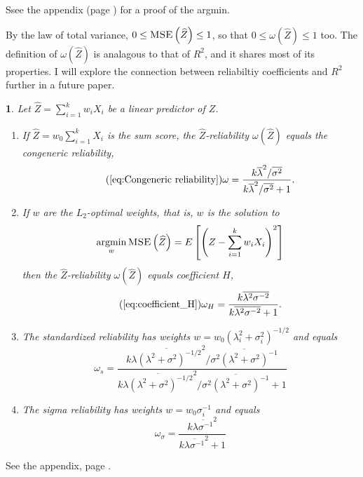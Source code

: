 \documentclass{article}
\makeatletter
\theoremstyle{plain}
\theoremstyle{plain}
\theoremstyle{definition}
\theoremstyle{remark}
\theoremstyle{definition}
\theoremstyle{plain}
\theoremstyle{plain}
\newtheorem{prop}[thm]{\protect\propositionname}
\theoremstyle{definition}
\newenvironment{proof}[1][\protect\proofname]{\par
	\normalfont\topsep6\p@\@plus6\p@\relax
	\trivlist
	\itemindent\parindent
	\item[\hskip\labelsep\scshape #1]\ignorespaces
}{%
	\endtrivlist\@endpefalse
}
\providecommand{\proofname}{Proof}
\providecommand{\propositionname}{Proposition}
\DeclareMathOperator{\argmin}{argmin}
\makeatother
\begin{document}
Ssee the appendix (page \pageref{proof:w0}) for a proof of the argmin.

By the law of total variance, $0\leq\textsc{MSE}\left(\widehat{Z}\right)\leq1$,
so that $0\leq\omega\left(\widehat{Z}\right)\leq1$ too. The definition
of $\omega(\widehat{Z})$ is analagous to that of $R^{2}$, and it
shares most of its properties. I will explore the connection between
reliabiltiy coefficients and $R^{2}$ further in a future paper.
\begin{prop}
\label{prop:Z-reliabiltiy}Let $\widehat{Z}=\sum_{i=1}^{k}w_{i}X_{i}$
be a linear predictor of $Z$.

\begin{enumerate}[label=(\roman*)]
\item If $\widehat{Z}=w_{0}\sum_{i=1}^{k}X_{i}$ is the sum score, the $\widehat{Z}$-reliability
$\omega\left(\widehat{Z}\right)$ equals the congeneric reliability,
\begin{equation}
\tag{\ref{eq:Congeneric reliability}}
\omega=\frac{k\overline{\lambda}^{2}/\overline{\sigma^{2}}}{k\overline{\lambda}^{2}/\overline{\sigma^{2}}+1}.
\end{equation}
\item If $w$ are the $L_{2}$-optimal weights, that is, $w$ is the solution
to
\[
\argmin_{w}\textsc{MSE}\left(\widehat{Z}\right)=E\left[\left(Z-\sum_{i=1}^{k}w_{i}X_{i}\right)^{2}\right]
\]
then the $\widehat{Z}$-reliability $\omega\left(\widehat{Z}\right)$
equals coefficient $H$,
\begin{equation}
\tag{\ref{eq:coefficient_H}}
\omega_{H}=\frac{k\overline{\lambda^{2}\sigma^{-2}}}{k\overline{\lambda^{2}\sigma^{-2}}+1}.
\end{equation}
\item The standardized reliability has weights $w=w_{0}(\lambda_{i}^{2}+\sigma_{i}^{2})^{-1/2}$ and equals
\begin{equation}
\omega_s=\frac{k\overline{\lambda(\lambda^{2}+\sigma^{2})^{-1/2}}^{2}/\overline{\sigma^{2}(\lambda^{2}+\sigma^{2})^{-1}}}{k\overline{\lambda(\lambda^{2}+\sigma^{2})^{-1/2}}^{2}/\overline{\sigma^{2}(\lambda^{2}+\sigma^{2})^{-1}}+1}\label{eq:Standardized reliability}
\end{equation}
\item The sigma reliability has weights $w=w_{0}\sigma_{i}^{-1}$ and equals
\begin{equation}
\omega_\sigma=\frac{k\overline{\lambda\sigma^{-1}}^{2}}{k\overline{\lambda\sigma^{-1}}^{2}+1}\label{eq:Sigma-standardized reliability}
\end{equation}
\end{enumerate}
\end{prop}
\begin{proof}
See the appendix, page \pageref{proof:Z-reliability}.
\end{proof}
\end{document}
